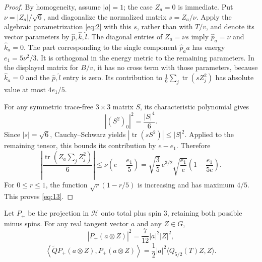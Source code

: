 \begin{proof}
By homogeneity, assume \(|a|=1\); the case \(Z_a=0\) is immediate.
Put \(\nu=|Z_a|/\sqrt6\), and diagonalize the normalized matrix
\(s=Z_a/\nu\).  Apply the algebraic parametrization \eqref{eq:2} with
this \(s\), rather than with \(T/v\), and denote its vector parameters
by \(\widehat p,\widehat k,\widehat l\).
The diagonal entries of \(Z_a=\nu s\) imply
\(\widehat p_a=\nu\) and \(\widehat k_a=0\).
The part corresponding to the single component
\(\widehat p_a a\) has energy
\(e_1=5\nu^2/3\).  It is orthogonal in the energy metric to the
remaining parameters.  In the displayed matrix for \(B/v\), it has no
cross term with those parameters, because \(\widehat k_a=0\) and the
\(\widehat p,\widehat l\) entry is zero.  Its contribution to
\(\frac16\sum_j\operatorname{tr}(sZ_j^2)\) has absolute value at most
\(4e_1/5\).

For any symmetric trace-free \(3\times3\) matrix \(S\), its
characteristic polynomial gives
\[
 |(S^2)_0|^2=\frac{|S|^4}{6}.
\]
Since \(|s|=\sqrt6\), Cauchy--Schwarz yields
\(|\operatorname{tr}(sS^2)|\le |S|^2\).
Applied to the remaining tensor, this bounds its contribution by
\(e-e_1\).  Therefore
\[
 \left|\frac{\operatorname{tr}(Z_a\sum_jZ_j^2)}6\right|
 \le\nu\left(e-\frac{e_1}{5}\right)
 =\sqrt{\frac35}\,e^{3/2}
       \sqrt{\frac{e_1}{e}}\left(1-\frac{e_1}{5e}\right).
\]
For \(0\le r\le1\), the function \(\sqrt r(1-r/5)\) is increasing
and has maximum \(4/5\).  This proves \eqref{eq:13}.
\end{proof}

\begin{lemma}
\label{lem:real-vector-projections}
Let \(P_+\) be the projection in \(\mathcal H\) onto total plus spin
\(3\), retaining both possible minus spins.  For any real tangent vector
\(a\) and any \(Z\in G\),
\[
 |P_+(a\otimes Z)|^2=\frac7{12}|a|^2|Z|^2,
\]
\[
 \left\langle\widetilde QP_+(a\otimes Z),P_+(a\otimes Z)\right\rangle
 =\frac12|a|^2\langle Q_{5/2}(T)Z,Z\rangle.
\]
\end{lemma}

